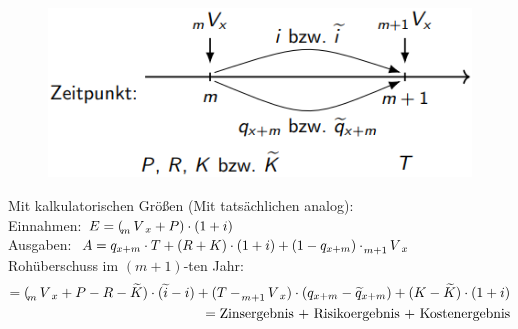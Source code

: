 \documentclass[12pt]{report}
\theoremstyle{dotless}
\theoremstyle{definition}
\begin{document}
\begin{figure}[ht]
	\centering
	\includegraphics[width = .8\textwidth]{Bilder/Kontributionsgleichung.png}
\end{figure}

Mit kalkulatorischen Größen (Mit tatsächlichen analog): \\
Einnahmen: $E=(\tensor[_m]{V}{}_x + P) \cdot (1+i)$\\
Ausgaben: $A=q_{x+m} \cdot T + (R+K) \cdot (1+i) + (1-q_{x+m})\cdot \tensor[_{m+1}]{V}{}_x$\\
Rohüberschuss im $(m+1)$-ten Jahr:
\begin{align}
=(\tensor[_m]{V}{}_x + P - R - \widetilde{K}) \cdot (\widetilde{i}-i) + (T -\tensor[_{m+1}]{V}{}_x) \cdot (q_{x+m} - \widetilde{q}_{x+m})+(K - \widetilde{K} ) \cdot (1+i) \\ = \text{Zinsergebnis + Risikoergebnis + Kostenergebnis}
\end{align}
\end{document}

